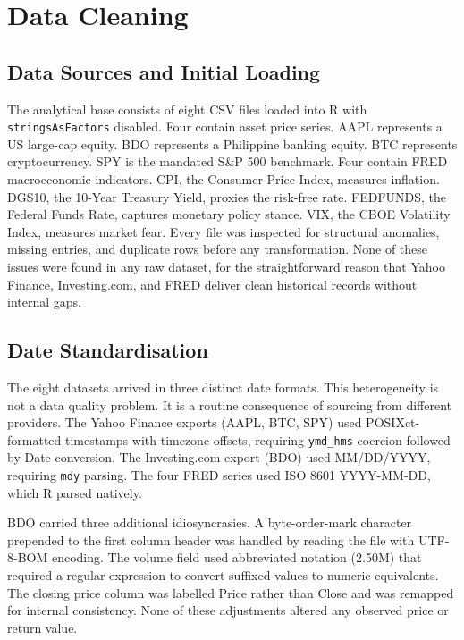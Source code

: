 \section{Data Cleaning}

\subsection{Data Sources and Initial Loading}

The analytical base consists of eight CSV files loaded into R with \texttt{stringsAsFactors} disabled. Four contain asset price series. AAPL represents a US large-cap equity. BDO represents a Philippine banking equity. BTC represents cryptocurrency. SPY is the mandated S\&P 500 benchmark. Four contain FRED macroeconomic indicators. CPI, the Consumer Price Index, measures inflation. DGS10, the 10-Year Treasury Yield, proxies the risk-free rate. FEDFUNDS, the Federal Funds Rate, captures monetary policy stance. VIX, the CBOE Volatility Index, measures market fear. Every file was inspected for structural anomalies, missing entries, and duplicate rows before any transformation. None of these issues were found in any raw dataset, for the straightforward reason that Yahoo Finance, Investing.com, and FRED deliver clean historical records without internal gaps.

\subsection{Date Standardisation}

The eight datasets arrived in three distinct date formats. This heterogeneity is not a data quality problem. It is a routine consequence of sourcing from different providers. The Yahoo Finance exports (AAPL, BTC, SPY) used POSIXct-formatted timestamps with timezone offsets, requiring \texttt{ymd\_hms} coercion followed by Date conversion. The Investing.com export (BDO) used MM/DD/YYYY, requiring \texttt{mdy} parsing. The four FRED series used ISO 8601 YYYY-MM-DD, which R parsed natively.

BDO carried three additional idiosyncrasies. A byte-order-mark character prepended to the first column header was handled by reading the file with UTF-8-BOM encoding. The volume field used abbreviated notation (2.50M) that required a regular expression to convert suffixed values to numeric equivalents. The closing price column was labelled Price rather than Close and was remapped for internal consistency. None of these adjustments altered any observed price or return value.

